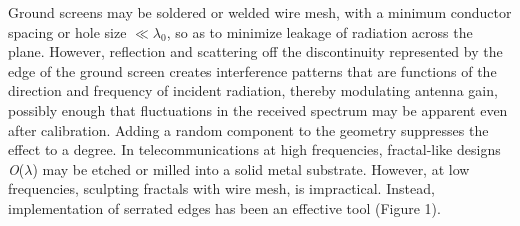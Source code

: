 Ground screens may be soldered or welded wire mesh, with a minimum conductor spacing or hole size $\ll \lambda_0$, so as to minimize leakage of radiation across the plane.  However, reflection and scattering off the discontinuity represented by the edge of the ground screen creates interference patterns that are functions of the direction and frequency of incident radiation, thereby modulating antenna gain, possibly enough that fluctuations in the received spectrum may be apparent even after calibration.  Adding a random component to the geometry suppresses the effect to a degree.  In telecommunications at high frequencies, fractal-like designs {\it O}($\lambda$) may be etched or milled into a solid metal substrate. However, at low frequencies, sculpting fractals with wire mesh, is impractical.  Instead, implementation of serrated edges has been an effective tool (Figure 1).


  
